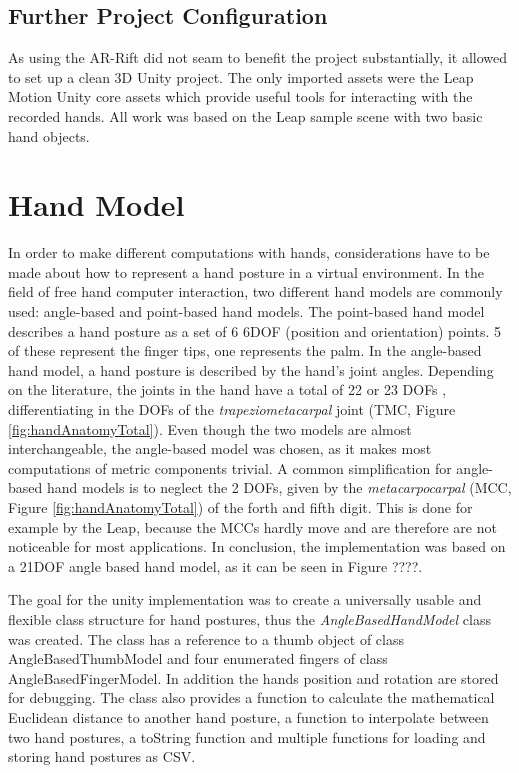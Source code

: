 \subsection{Further Project Configuration}

As using the AR-Rift did not seam to benefit the project substantially, it allowed to set up a clean 3D Unity project. The only imported assets were the Leap Motion Unity core assets which provide useful tools for interacting with the recorded hands. All work was based on the Leap sample scene with two basic hand objects. 

\section{Hand Model}

In order to make different computations with hands, considerations have to be made about how to represent a hand posture in a virtual environment. In the field of free hand computer interaction, two different hand models are commonly used: angle-based and point-based hand models.
The point-based hand model describes a hand posture as a set of 6 6DOF (position and orientation) points. 5 of these represent the finger tips, one represents the palm. In the angle-based hand model, a hand posture is described by the hand's joint angles. Depending on the literature, the joints in the hand have a total of 22 \cite{su1994logical} or 23 DOFs \cite{laviola1999survey}, differentiating in the DOFs of the \textit{trapeziometacarpal} joint (TMC, Figure \ref{fig:handAnatomyTotal}).
Even though the two models are almost interchangeable, the angle-based model was chosen, as it makes most computations of metric components trivial. A common simplification for angle-based hand models is to neglect the 2 DOFs, given by the \textit{metacarpocarpal} (MCC, Figure \ref{fig:handAnatomyTotal}) of the forth and fifth digit. This is done for example by the Leap, because the MCCs hardly move and are therefore are not noticeable for most applications. 
In conclusion, the implementation was based on a 21DOF angle based hand model, as it can be seen in \textcolor[rgb]{1,0,0}{Figure ????}.

The goal for the unity implementation was to create a universally usable and flexible class structure for hand postures, thus the \textsl{AngleBasedHandModel} class was created. The class has a reference to a thumb object of class AngleBasedThumbModel and four enumerated fingers of class AngleBasedFingerModel. In addition the hands position and rotation are stored for debugging. The class also provides a function to calculate the mathematical Euclidean distance to another hand posture, a function to interpolate between two hand postures, a toString function and multiple functions for loading and storing hand postures as CSV. 

